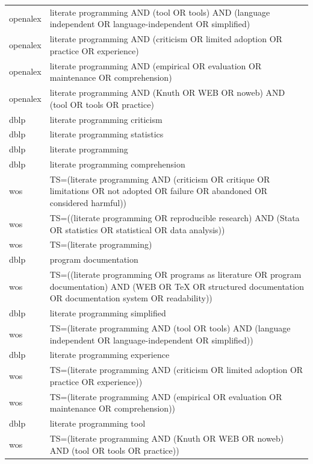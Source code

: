 \documentclass{article}
\begin{document}
\begin{longtable}{lp{10cm}}
openalex & \textquotedbl{}literate programming\textquotedbl{} AND (tool OR tools) AND (\textquotedbl{}language independent\textquotedbl{} OR \textquotedbl{}language-independent\textquotedbl{} OR simplified) \\
openalex & \textquotedbl{}literate programming\textquotedbl{} AND (criticism OR \textquotedbl{}limited adoption\textquotedbl{} OR practice OR experience) \\
openalex & \textquotedbl{}literate programming\textquotedbl{} AND (empirical OR evaluation OR maintenance OR comprehension) \\
openalex & \textquotedbl{}literate programming\textquotedbl{} AND (Knuth OR WEB OR noweb) AND (tool OR tools OR practice) \\
dblp & literate programming criticism \\
dblp & literate programming statistics \\
dblp & literate programming \\
dblp & literate programming comprehension \\
wos & TS=(\textquotedbl{}literate programming\textquotedbl{} AND (criticism OR critique OR limitations OR \textquotedbl{}not adopted\textquotedbl{} OR failure OR abandoned OR \textquotedbl{}considered harmful\textquotedbl{})) \\
wos & TS=((\textquotedbl{}literate programming\textquotedbl{} OR \textquotedbl{}reproducible research\textquotedbl{}) AND (Stata OR statistics OR statistical OR \textquotedbl{}data analysis\textquotedbl{})) \\
wos & TS=(\textquotedbl{}literate programming\textquotedbl{}) \\
dblp & program documentation \\
wos & TS=((\textquotedbl{}literate programming\textquotedbl{} OR \textquotedbl{}programs as literature\textquotedbl{} OR \textquotedbl{}program documentation\textquotedbl{}) AND (WEB OR TeX OR \textquotedbl{}structured documentation\textquotedbl{} OR \textquotedbl{}documentation system\textquotedbl{} OR readability)) \\
dblp & literate programming simplified \\
wos & TS=(\textquotedbl{}literate programming\textquotedbl{} AND (tool OR tools) AND (\textquotedbl{}language independent\textquotedbl{} OR \textquotedbl{}language-independent\textquotedbl{} OR simplified)) \\
dblp & literate programming experience \\
wos & TS=(\textquotedbl{}literate programming\textquotedbl{} AND (criticism OR \textquotedbl{}limited adoption\textquotedbl{} OR practice OR experience)) \\
wos & TS=(\textquotedbl{}literate programming\textquotedbl{} AND (empirical OR evaluation OR maintenance OR comprehension)) \\
dblp & literate programming tool \\
wos & TS=(\textquotedbl{}literate programming\textquotedbl{} AND (Knuth OR WEB OR noweb) AND (tool OR tools OR practice)) \\
\bottomrule
\end{longtable}
\end{document}

